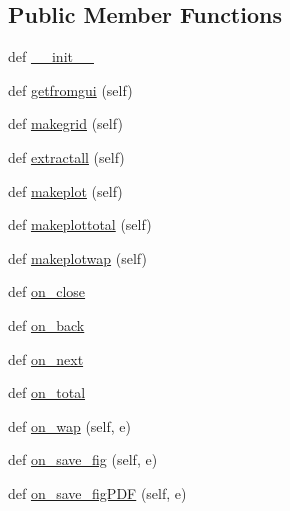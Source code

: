 \subsection*{Public Member Functions}
\begin{DoxyCompactItemize}
\item 
def \hyperlink{class_uni_dec_1_1unidec__modules_1_1_extract2_d_1_1_extract2_d_plot_ac05e6311ee5e6ea69aeed6b28a2d9226}{\+\_\+\+\_\+init\+\_\+\+\_\+}
\item 
def \hyperlink{class_uni_dec_1_1unidec__modules_1_1_extract2_d_1_1_extract2_d_plot_a9d0fc6253f6e451c31001496e4e4f3af}{getfromgui} (self)
\item 
def \hyperlink{class_uni_dec_1_1unidec__modules_1_1_extract2_d_1_1_extract2_d_plot_a25cc8faf288ecfca46b719a7e08d3f1b}{makegrid} (self)
\item 
def \hyperlink{class_uni_dec_1_1unidec__modules_1_1_extract2_d_1_1_extract2_d_plot_a82b2552cc68144075885d3ef8ea34470}{extractall} (self)
\item 
def \hyperlink{class_uni_dec_1_1unidec__modules_1_1_extract2_d_1_1_extract2_d_plot_a0318f7ce9ea336b3eec6212891af1236}{makeplot} (self)
\item 
def \hyperlink{class_uni_dec_1_1unidec__modules_1_1_extract2_d_1_1_extract2_d_plot_a900dd84589adb38b22f3377eea9756f3}{makeplottotal} (self)
\item 
def \hyperlink{class_uni_dec_1_1unidec__modules_1_1_extract2_d_1_1_extract2_d_plot_a5848299fb4c82c76acda389bcdb20904}{makeplotwap} (self)
\item 
def \hyperlink{class_uni_dec_1_1unidec__modules_1_1_extract2_d_1_1_extract2_d_plot_aa80f0f3634775e63ec2d19bf57de80e6}{on\+\_\+close}
\item 
def \hyperlink{class_uni_dec_1_1unidec__modules_1_1_extract2_d_1_1_extract2_d_plot_a6af8b9ab8bb5ca755acaaf111454fc3e}{on\+\_\+back}
\item 
def \hyperlink{class_uni_dec_1_1unidec__modules_1_1_extract2_d_1_1_extract2_d_plot_a6d4c5c70d173ef71c4bc8c2920dc1053}{on\+\_\+next}
\item 
def \hyperlink{class_uni_dec_1_1unidec__modules_1_1_extract2_d_1_1_extract2_d_plot_a6eb8177f7105fa937b06f95fa5e2f273}{on\+\_\+total}
\item 
def \hyperlink{class_uni_dec_1_1unidec__modules_1_1_extract2_d_1_1_extract2_d_plot_a70328e336b84f8ac725db5095d069098}{on\+\_\+wap} (self, e)
\item 
def \hyperlink{class_uni_dec_1_1unidec__modules_1_1_extract2_d_1_1_extract2_d_plot_aa626a51aa9d96917b3c5e932b385a5fa}{on\+\_\+save\+\_\+fig} (self, e)
\item 
def \hyperlink{class_uni_dec_1_1unidec__modules_1_1_extract2_d_1_1_extract2_d_plot_af992106fb9d4f0b192691b109d6db16f}{on\+\_\+save\+\_\+fig\+P\+D\+F} (self, e)
\end{DoxyCompactItemize}
